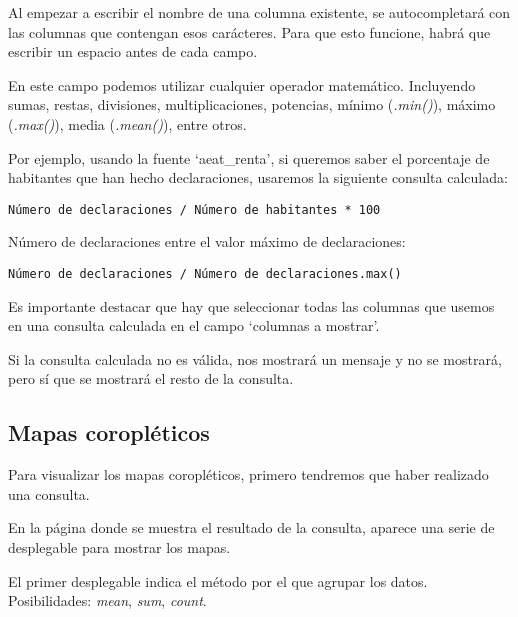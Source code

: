 Al empezar a escribir el nombre de una columna existente, se autocompletará con las columnas que contengan esos carácteres. Para que esto funcione, habrá que escribir un espacio antes de cada campo.


En este campo podemos utilizar cualquier operador matemático. Incluyendo sumas, restas, divisiones, multiplicaciones, potencias, mínimo (\textit{.min()}), máximo (\textit{.max()}), media (\textit{.mean()}), entre otros.

Por ejemplo, usando la fuente `aeat\_renta', si queremos saber el porcentaje de habitantes que han hecho declaraciones, usaremos la siguiente consulta calculada:

\begin{lstlisting}
Número de declaraciones / Número de habitantes * 100
\end{lstlisting}



Número de declaraciones entre el valor máximo de declaraciones:

\begin{lstlisting}
Número de declaraciones / Número de declaraciones.max()
\end{lstlisting}

Es importante destacar que hay que seleccionar todas las columnas que usemos en una consulta calculada en el campo `columnas a mostrar'.

Si la consulta calculada no es válida, nos mostrará un mensaje y no se mostrará, pero sí que se mostrará el resto de la consulta.


\subsection{Mapas coropléticos}

Para visualizar los mapas coropléticos, primero tendremos que haber realizado una consulta.

En la página donde se muestra el resultado de la consulta, aparece una serie de desplegable para mostrar los mapas. 


El primer desplegable indica el método por el que agrupar los datos. Posibilidades: \textit{mean}, \textit{sum}, \textit{count}.

